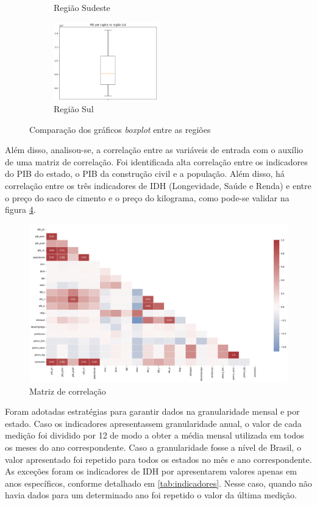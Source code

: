 \begin{figure}[H]
\begin{subfigure}{5cm}
        \caption{Região Sudeste}
        \label{fig:boxplot-se}
    \end{subfigure}
    \begin{subfigure}{5cm}
        \centering 
        \includegraphics[width=4.5cm]{../figuras/graficos/boxplot-pib-cc-s.png}
        \caption{Região Sul}
        \label{fig:boxplot-s}
    \end{subfigure}
    \caption{Comparação dos gráficos \textit{boxplot} entre as regiões}
  \end{figure}

Além disso, analisou-se, a correlação entre as variáveis de entrada com o auxílio 
de uma matriz de correlação. Foi identificada
alta correlação entre os indicadores do PIB do estado, o PIB da construção
civil e a população. Além disso, há correlação entre os três indicadores
de IDH (Longevidade, Saúde e Renda) e entre o preço do saco de cimento e o preço do kilograma, como pode-se
validar na figura \ref{fig:matriz-corr}.

\begin{figure}[H]
    \centering
    \includegraphics[width=13cm]{../figuras/graficos/matriz-corr.png}
    \caption{Matriz de correlação}
    \label{fig:matriz-corr}
\end{figure}

Foram adotadas estratégias para garantir dados na granularidade
mensal e por estado. Caso os indicadores apresentassem granularidade anual, o valor de
cada medição foi dividido por 12 de modo a obter a média mensal utilizada em 
todos os meses do ano correspondente. Caso a granularidade
fosse a nível de Brasil, o valor apresentado foi repetido para todos os 
estados no mês e ano correspondente. As exceções foram os 
indicadores de IDH por apresentarem valores apenas em anos específicos, conforme 
detalhado em \ref{tab:indicadores}. Nesse caso, quando não havia dados para um 
determinado ano foi repetido o valor da última medição.

